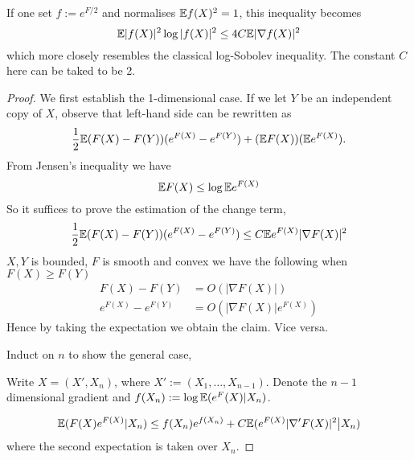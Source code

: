 \begin{remark}
    If one set $f:=e^{F/2}$ and normalises $\mathbb{E} f(X)^2=1$, this inequality becomes 
    \begin{equation*}
        \mathbb{E} |f(X)|^2 \log |f(X)|^2 \leq 4C \mathbb{E} |\nabla f(X)|^2
    \end{equation*}
    which more closely resembles the classical log-Sobolev inequality. The constant $C$ here can be taked to be 2.
\end{remark}

\begin{proof}
    We first establish the 1-dimensional case. If we let $Y$ be an independent copy of $X$, observe that left-hand side can be rewritten as 
    \begin{equation*}
        \frac{1}{2}\mathbb{E} (F(X)-F(Y))(e^{F(X)}-e^{F(Y)})+(\mathbb{E} F(X)) (\mathbb{E} e^{F(X)}).
    \end{equation*}
    From Jensen's inequality we have 
    \begin{equation*}
        \mathbb{E} F(X) \leq \log \mathbb{E} e^{F(X)}
    \end{equation*}
    So it suffices to prove the estimation of the change term,
    \begin{equation*}
        \frac{1}{2}\mathbb{E} (F(X)-F(Y))(e^{F(X)}-e^{F(Y)}) \leq C\mathbb{E} e^{F(X)}|\nabla F(X)|^2
    \end{equation*}
    $X,Y$ is bounded, $F$ is smooth and convex  we have the following when $F(X)\geq F(Y)$
    \begin{eqnarray*}
        F(X)-F(Y) &= O(|\nabla F(X)|) \\
        e^{F(X)} - e^{F(Y)} &= O(|\nabla F(X)|e^{F(X)})
    \end{eqnarray*}
    Hence by taking the expectation we obtain the claim. Vice versa.

    Induct on $n$ to show the general case,

    Write $X=(X',X_n)$, where $X':=(X_1,\dots,X_{n-1})$. Denote the $n-1$ dimensional gradient and $f(X_n):=\log \mathbb{E} (e^F(X)|X_n)$.
    
    \begin{equation*}
        \mathbb{E}(F(X)e^{F(X)}|X_n) \leq f(X_n) e^{f(X_n)} + C\mathbb{E} (e^{F(X)}|\nabla'F(X)|^2\big | X_n)
    \end{equation*}
    where the second expectation is taken over $X_n$.


\end{proof}
